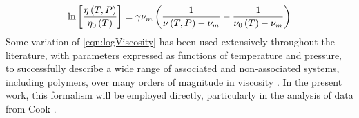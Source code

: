 \begin{equation}
	\centering
	\ln\left[\frac{\eta\left(T,P\right)}{\eta_0\left(T \right )}\right]=\gamma\nu_m\left(\frac{1}{\nu\left(T,P \right )-\nu_m} - \frac{1}{\nu_0\left(T \right )-\nu_m}\right )
	\label{eqn:logViscosity}
\end{equation}
\noindent Some variation of \eqn\nolinebreak \ref{eqn:logViscosity} has been used extensively throughout the literature, with parameters expressed as functions of temperature and pressure, to successfully describe a wide range of associated and non-associated systems, including polymers, over many orders of magnitude in viscosity \cite{Cook,White,Yasutomi,Matsuoka}. In the present work, this formalism will be employed directly, particularly in the analysis of data from Cook \etal.